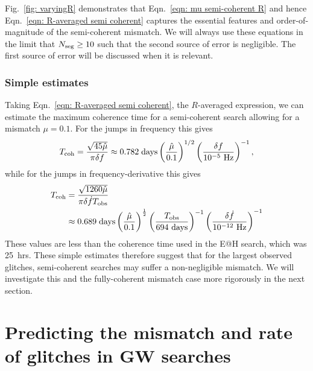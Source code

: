 \documentclass[../full_thesis/full_thesis.tex]{subfiles}
\begin{document}
Fig.~\ref{fig: varyingR} demonstrates that Eqn.~\eqref{eqn: mu semi-coherent R}
and hence Eqn.~\eqref{eqn: R-averaged semi coherent} captures the essential
features and order-of-magnitude of the semi-coherent mismatch. We will always
use these equations in the limit that $N_{\textrm{seg}} \ge 10$ such that the second source
of error is negligible. The first source of error will be discussed when it is
relevant.

\subsubsection{Simple estimates}
Taking Eqn.~\eqref{eqn: R-averaged semi coherent}, the $R$-averaged expression,
we can estimate the maximum coherence time
for a semi-coherent search allowing for a mismatch $\mu=0.1$. For the jumps in
frequency this gives
\begin{align}
T_{\mathrm{coh}} = \frac{\sqrt{45\hat{\mu}}}{\pi\delta f}
\approx 0.782 \;\mathrm{ days}
\left(\frac{\hat{\mu}}{0.1}\right)^{1/2}
\left(\frac{\delta f}{10^{-5}\textrm{ Hz}}\right)^{-1},
\end{align}
while for the jumps in frequency-derivative this gives
\begin{align}
\begin{split}
T_{\mathrm{coh}} & = \frac{\sqrt{1260\hat{\mu}}}{\pi\delta\dot{f}T_{\mathrm{obs}}} \\
& \approx 0.689 \;\mathrm{ days}
\left(\frac{\hat{\mu}}{0.1}\right)^{\frac{1}{2}}
\left(\frac{T_{\mathrm{obs}}}{694 \textrm{ days}}\right)^{-1}
\left(\frac{\delta\dot{f}}{10^{-12}\textrm{ Hz}}\right)^{-1}
\end{split}
\end{align}
These values are less than the coherence time used in the E@H search, which
was 25~hrs. These simple estimates therefore suggest that for the largest
observed glitches, semi-coherent searches may suffer a non-negligible mismatch.
We will investigate this and the fully-coherent mismatch case more rigorously
in the next section.

\section{Predicting the mismatch and rate of glitches in GW searches}
\label{sec: estimating the mismatch}
\end{document}
